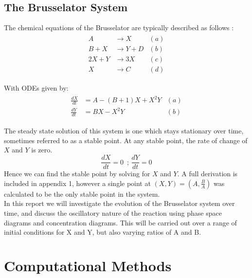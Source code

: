 \documentclass[reprint, amsmath, amssymb, aps]{revtex4-2}
\begin{document}
\subsection{The Brusselator System}
The chemical equations of the Brusselator are typically described as follows \cite{manual}:
\begin{align}
	\begin{aligned}
	A &\rightarrow X & (a)\\
	B + X &\rightarrow Y + D & (b)\\
	2X + Y &\rightarrow 3X & (c)\\
	X &\rightarrow C & (d)
	\end{aligned}
\end{align}

With ODEs given by:
\begin{align}
	\begin{aligned}
	\frac{dX}{dt} &= A - (B + 1)X + X^2 Y & (a)\\
	\frac{dY}{dt} &= BX - X^2 Y & (b)
	\end{aligned}
	\label{eq:rate}
\end{align}

The steady state solution of this system is one which stays stationary over time, sometimes referred to as a stable point. At any stable point, the rate of change of $X$ and $Y$ is zero.
\begin{equation}
	\frac{dX}{dt}=0\,\text{  ;  }\frac{dY}{dt}=0
\end{equation}Hence we can find the stable point by solving for $X$ and $Y$. A full derivation is included in appendix 1, however a single point at $(X, Y) = \left(A, \frac{B}{A}\right)$ was calculated to be the only stable point in the system.\\

In this report we will investigate the evolution of the Brusselator system over time, and discuss the oscillatory nature of the reaction using phase space diagrams and concentration diagrams. This will be carried out over a range of initial conditions for X and Y, but also varying ratios of A and B.

\section{Computational Methods}
\end{document}
